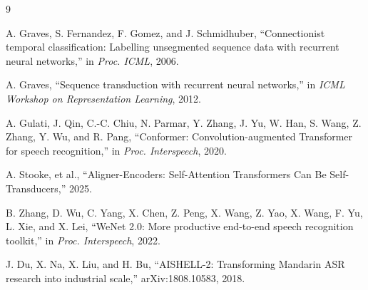 \documentclass[conference]{IEEEtran}
\begin{document}
\begin{thebibliography}{9}

A. Graves, S. Fernandez, F. Gomez, and J. Schmidhuber,
``Connectionist temporal classification: Labelling unsegmented sequence data with
recurrent neural networks,''
in \emph{Proc. ICML}, 2006.

A. Graves,
``Sequence transduction with recurrent neural networks,''
in \emph{ICML Workshop on Representation Learning}, 2012.

A. Gulati, J. Qin, C.-C. Chiu, N. Parmar, Y. Zhang, J. Yu, W. Han,
S. Wang, Z. Zhang, Y. Wu, and R. Pang,
``Conformer: Convolution-augmented Transformer for speech recognition,''
in \emph{Proc. Interspeech}, 2020.

A. Stooke, et al.,
``Aligner-Encoders: Self-Attention Transformers Can Be Self-Transducers,''
2025.

B. Zhang, D. Wu, C. Yang, X. Chen, Z. Peng, X. Wang, Z. Yao, X. Wang,
F. Yu, L. Xie, and X. Lei,
``WeNet 2.0: More productive end-to-end speech recognition toolkit,''
in \emph{Proc. Interspeech}, 2022.

J. Du, X. Na, X. Liu, and H. Bu,
``AISHELL-2: Transforming Mandarin ASR research into industrial scale,''
arXiv:1808.10583, 2018.

\end{thebibliography}
\end{document}
